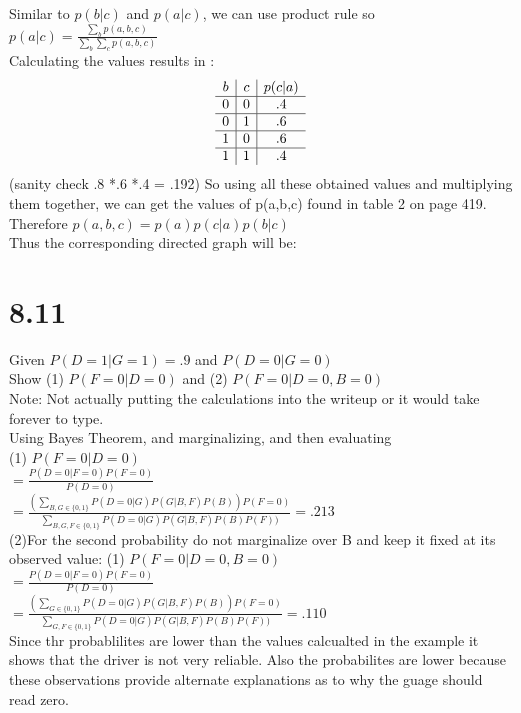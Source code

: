 \documentclass[11pt,leqno,fleqn]{article}
\begin{document}
Similar to $p(b|c)$ and $p(a|c)$, we can use product rule so \\
$p(a|c) = \frac{\sum_b p(a,b,c)}{\sum_b \sum_c p(a,b,c)}$\\
Calculating the values results in :
\[
\begin{array}{ c | c | c  }
b & c &p(c|a)
   
\\ \hline 
 0 & 0 &  .4
\\ \hline  
 0 & 1 &  .6
\\ \hline  
 1 & 0 & .6
\\ \hline  
 1 & 1 & .4
\end{array}
\]
(sanity check .8 *.6 *.4 = .192) So using all these obtained values and multiplying them together, we can get the values of p(a,b,c) found in table 2 on page 419. Therefore  $p(a,b,c) = p(a) p(c|a) p(b|c)$\\
Thus the corresponding directed graph will be:\\

\newpage
\section{8.11}
Given $P(D= 1 | G = 1) = .9$ and $P(D = 0|G = 0)$\\
Show (1) $P(F= 0|D = 0)$ and (2) $P(F=0|D=0,B=0)$\\
Note: Not actually putting the calculations into the writeup or it would take forever to type.\\
Using Bayes Theorem, and marginalizing, and then evaluating  \\
(1) $P(F = 0 | D = 0)$ \\
$= \frac{P(D = 0| F = 0) P(F = 0)}{P(D = 0)} $\\
$= \frac{(\sum_{B,G \in \{ 0,1\}} P(D = 0|G) P(G|B,F)P(B))P(F = 0)}{\sum_{B,G,F \in \{ 0,1\}} P(D=0|G)P(G|B,F)P(B)P(F))} = .213$\\
(2)For the second  probability do not marginalize over B and keep it fixed at its observed value:
(1) $P(F=0|D=0,B=0)$\\
$ = \frac{P(D = 0| F = 0) P(F = 0)}{P(D = 0)}$\\
 $= \frac{(\sum_{G \in \{ 0,1\}} P(D = 0|G) P(G|B,F)P(B))P(F = 0)}{\sum_{G,F \in \{ 0,1\}} P(D=0|G)P(G|B,F)P(B)P(F))} = .110$ \\
Since thr probablilites are lower than the values calcualted in the example it shows that the driver is not very reliable. Also the probabilites are lower because these observations provide alternate explanations as to why the guage should read zero.
\end{document}
